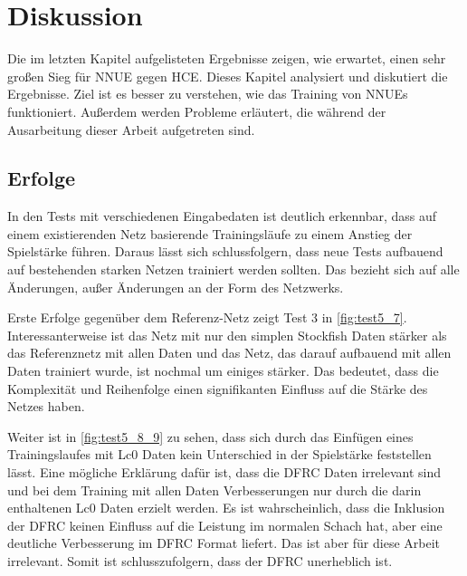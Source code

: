 \chapter{Diskussion}
\label{chap:discussion}

Die im letzten Kapitel aufgelisteten Ergebnisse zeigen, wie erwartet, einen sehr großen Sieg für \ac{NNUE} gegen \ac{HCE}. Dieses Kapitel analysiert und diskutiert die Ergebnisse. Ziel ist es besser zu verstehen, wie das Training von \acp{NNUE} funktioniert. Außerdem werden Probleme erläutert, die während der Ausarbeitung dieser Arbeit aufgetreten sind.

\section{Erfolge}

In den Tests mit verschiedenen Eingabedaten ist deutlich erkennbar, dass auf einem existierenden Netz basierende Trainingsläufe zu einem Anstieg der Spielstärke führen. Daraus lässt sich schlussfolgern, dass neue Tests aufbauend auf bestehenden starken Netzen trainiert werden sollten. Das bezieht sich auf alle Änderungen, außer Änderungen an der Form des Netzwerks.

Erste Erfolge gegenüber dem Referenz-Netz zeigt Test 3 in \autoref{fig:test5_7}. Interessanterweise ist das Netz mit nur den simplen Stockfish Daten stärker als das Referenznetz mit allen Daten und das Netz, das darauf aufbauend mit allen Daten trainiert wurde, ist nochmal um einiges stärker. Das bedeutet, dass die Komplexität und Reihenfolge einen signifikanten Einfluss auf die Stärke des Netzes haben.

Weiter ist in \autoref{fig:test5_8_9} zu sehen, dass sich durch das Einfügen eines Trainingslaufes mit \ac{Lc0} Daten kein Unterschied in der Spielstärke feststellen lässt. Eine mögliche Erklärung dafür ist, dass die \ac{DFRC} Daten irrelevant sind und bei dem Training mit allen Daten Verbesserungen nur durch die darin enthaltenen \ac{Lc0} Daten erzielt werden. Es ist wahrscheinlich, dass die Inklusion der \ac{DFRC} keinen Einfluss auf die Leistung im normalen Schach hat, aber eine deutliche Verbesserung im \ac{DFRC} Format liefert. Das ist aber für diese Arbeit irrelevant. Somit ist schlusszufolgern, dass der \ac{DFRC} unerheblich ist.

